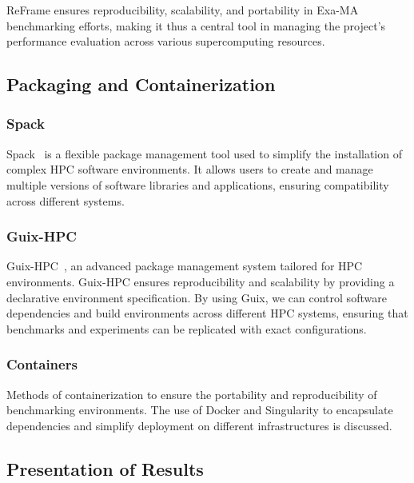 ReFrame ensures reproducibility, scalability, and portability in Exa-MA benchmarking efforts, making it thus a central tool in managing the project’s performance evaluation across various supercomputing resources.


\subsection{Packaging and Containerization}
\label{sec:methodology-packaging}

\subsubsection{Spack}
\label{sec:methodology-packaging-spack}

Spack~\cite{gamblin_spack_2015} is a flexible package management tool used to simplify the installation of complex HPC software environments. It allows users to create and manage multiple versions of software libraries and applications, ensuring compatibility across different systems.

\subsubsection{Guix-HPC}
\label{sec:methodology-packaging-guix-hpc}

Guix-HPC~\cite{vallet_toward_2022}, an advanced package management system tailored for HPC environments. Guix-HPC ensures reproducibility and scalability by providing a declarative environment specification. By using Guix, we can control software dependencies and build environments across different HPC systems, ensuring that benchmarks and experiments can be replicated with exact configurations.


\subsubsection{Containers}
\label{sec:methodology-packaging-container}

Methods of containerization to ensure the portability and reproducibility of benchmarking environments.
The use of Docker and Singularity to encapsulate dependencies and simplify deployment on different infrastructures is discussed.

\subsection{Presentation of Results}
\label{sec:methodology-presentation}

